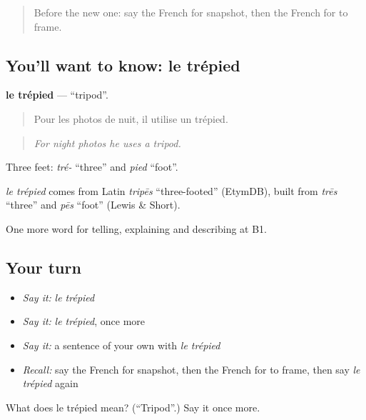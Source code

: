 \label{lesson:FR-C502-trepied}



\begin{quote}
Before the new one: say the French for snapshot, then the French for to frame.
\end{quote}

\subsection*{You'll want to know: le trépied}
\textbf{le trépied} — \textquotedblleft{}tripod\textquotedblright{}.

\begin{quote}
Pour les photos de nuit, il utilise un trépied.
\end{quote}

\begin{quote}
\emph{For night photos he uses a tripod.}
\end{quote}

Three feet: \emph{tré-} \textquotedblleft{}three\textquotedblright{} and \emph{pied} \textquotedblleft{}foot\textquotedblright{}.

\begin{cousinweb}
\emph{le trépied} comes from Latin \emph{tripēs} \textquotedblleft{}three-footed\textquotedblright{} (EtymDB), built from \emph{trēs} \textquotedblleft{}three\textquotedblright{} and \emph{pēs} \textquotedblleft{}foot\textquotedblright{} (Lewis \& Short).
\end{cousinweb}

\begin{grammarlens}[title={What you've built}]
One more word for telling, explaining and describing at B1.
\end{grammarlens}

\subsection*{Your turn}
\begin{itemize}
\raggedright
  \item \emph{Say it:} \emph{le trépied}
  \item \emph{Say it:} \emph{le trépied}, once more
  \item \emph{Say it:} a sentence of your own with \emph{le trépied}
  \item \emph{Recall:} say the French for snapshot, then the French for to frame, then say \emph{le trépied} again
\end{itemize}

\begin{tcolorbox}[breakable,colback=teal!4,colframe=teal!35!black,title={Before you move on}]
What does le trépied mean? (\textquotedblleft{}Tripod\textquotedblright{}.) Say it once more.
\end{tcolorbox}
